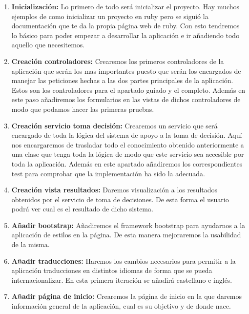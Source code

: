 \begin{enumerate}
  \item \textbf{Inicialización:} Lo primero de todo será inicializar el proyecto.
    Hay muchos ejemplos de como inicializar un proyecto en ruby pero se siguió
    la documentación que te da la propia página web de ruby. Con esto tendremos
    lo básico para poder empezar a desarrollar la aplicación e ir añadiendo todo
    aquello que necesitemos.

  \item \textbf{Creación controladores:} Crearemos los primeros controladores de
    la aplicación que serán los mas importantes puesto que serán los encargados
    de manejar las peticiones hechas a las dos partes principales de la aplicación.
    Estos son los controladores para el apartado guiado y el completo. Además
    en este paso añadiremos los formularios en las vistas de dichos controladores
    de modo que podamos hacer las primeras pruebas.

  \item \textbf{Creación servicio toma decisión:} Crearemos un servicio que será
    encargado de toda la lógica del sistema de apoyo a la toma de decisión. Aquí
    nos encargaremos de trasladar todo el conocimiento obtenido anteriormente
    a una clase que tenga toda la lógica de modo que este servicio sea accesible
    por toda la aplicación. Además en este apartado añadiremos los correspondientes
    test para comprobar que la implementación ha sido la adecuada.

  \item \textbf{Creación vista resultados:} Daremos visualización a los resultados
    obtenidos por el servicio de toma de decisiones. De esta forma el usuario podrá
    ver cual es el resultado de dicho sistema.

  \item \textbf{Añadir bootstrap:} Añadiremos el framework bootstrap para ayudarnos
    a la aplicación de estilos en la página. De esta manera mejoraremos la usabilidad
    de la misma.

  \item \textbf{Añadir traducciones:} Haremos los cambios necesarios para permitir
    a la aplicación traducciones en distintos idiomas de forma que se pueda
    internacionalizar. En esta primera iteración se añadirá castellano e inglés.

  \item \textbf{Añadir página de inicio:} Crearemos la página de inicio en la que
    daremos información general de la aplicación, cual es su objetivo y de donde nace.


\end{enumerate}

